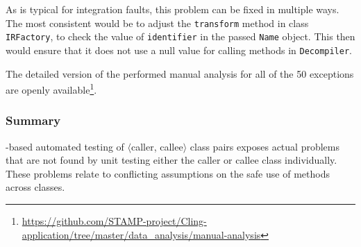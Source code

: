 %

As is typical for integration faults, this problem can be fixed in multiple ways. The most consistent would be to adjust the \texttt{transform} method in class \texttt{IRFactory}, to check the value of \texttt{identifier} in the passed \texttt{Name} object. This then would ensure that it does not use a null value for calling methods in \texttt{Decompiler}.


The detailed version of the performed manual analysis for all of the 50 exceptions are openly available\footnote{\url{https://github.com/STAMP-project/Cling-application/tree/master/data\_analysis/manual-analysis}}.

\subsubsection{Summary}
\integration-based automated testing of $\langle$caller, callee$\rangle$ class pairs exposes actual problems that are not found by unit testing either the caller or callee class individually. These problems relate to conflicting assumptions on the safe use of methods across classes.